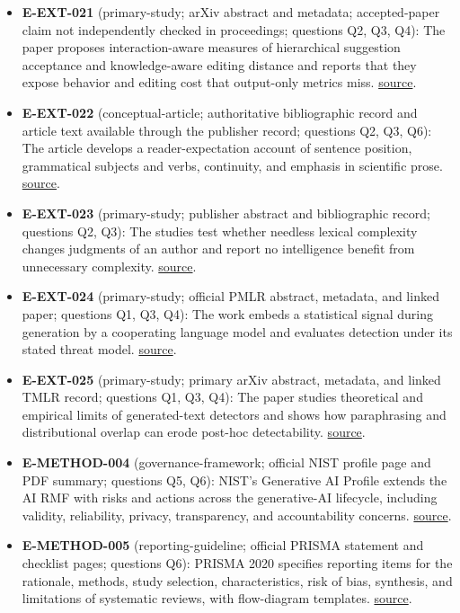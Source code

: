 \documentclass[11pt]{article}
\begin{document}
\begin{itemize}
\item
  \textbf{E-EXT-021} (primary-study; arXiv abstract and metadata; accepted-paper claim not independently checked in proceedings; questions Q2, Q3, Q4): The paper proposes interaction-aware measures of hierarchical suggestion acceptance and knowledge-aware editing distance and reports that they expose behavior and editing cost that output-only metrics miss. \href{https://arxiv.org/abs/2605.23535}{source}.
\item
  \textbf{E-EXT-022} (conceptual-article; authoritative bibliographic record and article text available through the publisher record; questions Q2, Q3, Q6): The article develops a reader-expectation account of sentence position, grammatical subjects and verbs, continuity, and emphasis in scientific prose. \href{https://scholars.duke.edu/publication/881487}{source}.
\item
  \textbf{E-EXT-023} (primary-study; publisher abstract and bibliographic record; questions Q2, Q3): The studies test whether needless lexical complexity changes judgments of an author and report no intelligence benefit from unnecessary complexity. \href{https://doi.org/10.1002/acp.1178}{source}.
\item
  \textbf{E-EXT-024} (primary-study; official PMLR abstract, metadata, and linked paper; questions Q1, Q3, Q4): The work embeds a statistical signal during generation by a cooperating language model and evaluates detection under its stated threat model. \href{https://proceedings.mlr.press/v202/kirchenbauer23a.html}{source}.
\item
  \textbf{E-EXT-025} (primary-study; primary arXiv abstract, metadata, and linked TMLR record; questions Q1, Q3, Q4): The paper studies theoretical and empirical limits of generated-text detectors and shows how paraphrasing and distributional overlap can erode post-hoc detectability. \href{https://arxiv.org/abs/2303.11156}{source}.
\item
  \textbf{E-METHOD-004} (governance-framework; official NIST profile page and PDF summary; questions Q5, Q6): NIST's Generative AI Profile extends the AI RMF with risks and actions across the generative-AI lifecycle, including validity, reliability, privacy, transparency, and accountability concerns. \href{https://www.nist.gov/itl/ai-risk-management-framework}{source}.
\item
  \textbf{E-METHOD-005} (reporting-guideline; official PRISMA statement and checklist pages; questions Q6): PRISMA 2020 specifies reporting items for the rationale, methods, study selection, characteristics, risk of bias, synthesis, and limitations of systematic reviews, with flow-diagram templates. \href{https://www.prisma-statement.org/prisma-2020}{source}.

\end{itemize}
\end{document}
